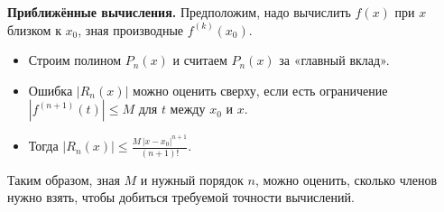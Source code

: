 \begin{customexample}
	\textbf{Приближённые вычисления.}
	Предположим, надо вычислить $f(x)$ при $x$ близком к $x_0$, зная производные $f^{(k)}(x_0)$.
	\begin{itemize}
		\item Строим полином $P_n(x)$ и считаем $P_n(x)$ за «главный вклад».
		\item Ошибка $|R_n(x)|$ можно оценить сверху, если есть ограничение
		      $|f^{(n+1)}(t)| \le M$ для $t$ между $x_0$ и $x$.
		\item Тогда
		      \(\displaystyle |R_n(x)| \le \frac{M\,|x-x_0|^{n+1}}{(n+1)!}.\)
	\end{itemize}
	Таким образом, зная $M$ и нужный порядок $n$, можно оценить, сколько членов нужно взять, чтобы добиться требуемой точности вычислений.
\end{customexample}
